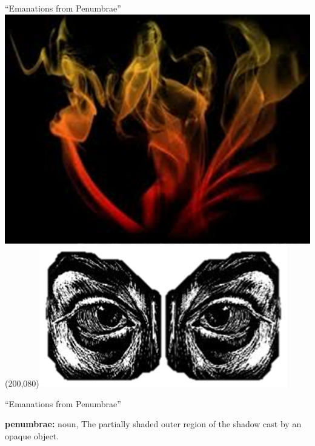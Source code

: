 \begin{frame}{``Emanations from Penumbrae''}
   \centering
   \includegraphics[height=.7\textheight]{img/fire.png} \\
   \Put(200,080){\includegraphics[width=.4\textwidth]{img/eyes.png}}
\end{frame}

\begin{frame}{``Emanations from Penumbrae''}
    \begin{varblock}[.9\textwidth]{}
        \textbf{penumbrae:} noun, The partially shaded outer region of the shadow cast by an opaque object.
    \end{varblock}
\end{frame}

